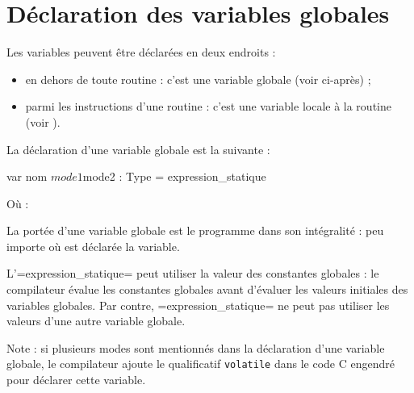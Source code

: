 




\chapter{Déclaration des variables globales}

Les variables peuvent être déclarées en deux endroits :
\begin{itemize}
  \item en dehors de toute routine : c'est une variable globale (voir ci-après) ;
  \item parmi les instructions d'une routine : c'est une variable locale à la routine (voir ).
\end{itemize}






La déclaration d'une variable globale est la suivante :

\begin{PLM}
var nom $mode1 $mode2 : Type = expression_statique
\end{PLM}

Où :

La portée d'une variable globale est le programme dans son intégralité : peu importe où est déclarée la variable.

L'\plm=expression_statique= peut utiliser la valeur des constantes globales : le compilateur évalue les constantes globales avant d'évaluer les valeurs initiales des variables globales. Par contre, \plm=expression_statique= ne peut pas utiliser les valeurs d'une autre variable globale.

Note : si plusieurs modes sont mentionnés dans la déclaration d'une variable globale, le compilateur ajoute le qualificatif \texttt{volatile} dans le code C engendré pour déclarer cette variable.



